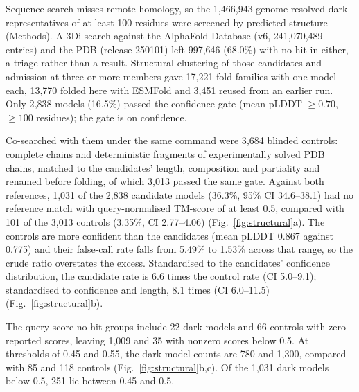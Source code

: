 \documentclass[11pt]{article}
\begin{document}
Sequence search misses remote homology, so the 1{,}466{,}943 genome-resolved dark representatives
of at least 100 residues were screened by predicted structure (Methods). A 3Di search against the
AlphaFold Database (v6, 241{,}070{,}489 entries) and the PDB (release 250101) left 997{,}646
(68.0\%) with no hit in either, a triage rather than a result. Structural clustering of those
candidates and admission at three or more members gave 17{,}221 fold families with one model each,
13{,}770 folded here with ESMFold and 3{,}451 reused from an earlier run. Only 2{,}838 models
(16.5\%) passed the confidence gate (mean pLDDT $\geq 0.70$, $\geq 100$ residues); the gate is on
confidence.

Co-searched with them under the same command were 3{,}684 blinded controls: complete chains and
deterministic fragments of experimentally solved PDB chains, matched to the candidates' length,
composition and partiality and renamed before folding, of which 3{,}013 passed the same gate.
Against both references, 1{,}031 of the 2{,}838 candidate models (36.3\%, 95\% CI 34.6--38.1) had
no reference match with query-normalised TM-score of at least 0.5, compared with 101 of the 3{,}013 controls (3.35\%,
CI 2.77--4.06) (Fig.~\ref{fig:structural}a). The controls are more confident than the candidates
(mean pLDDT 0.867 against 0.775) and their false-call rate falls from 5.49\% to 1.53\% across that
range, so the crude ratio overstates the excess. Standardised to the candidates' confidence
distribution, the candidate rate is 6.6 times the control rate (CI 5.0--9.1); standardised to confidence and
length, 8.1 times (CI 6.0--11.5) (Fig.~\ref{fig:structural}b).

The query-score no-hit groups include 22 dark models and 66 controls with zero reported
scores, leaving 1{,}009 and 35 with nonzero scores below 0.5. At thresholds of 0.45 and 0.55,
the dark-model counts are 780 and 1{,}300, compared with 85 and 118 controls
(Fig.~\ref{fig:structural}b,c). Of the 1{,}031 dark models below 0.5, 251 lie between 0.45 and 0.5.
\end{document}
